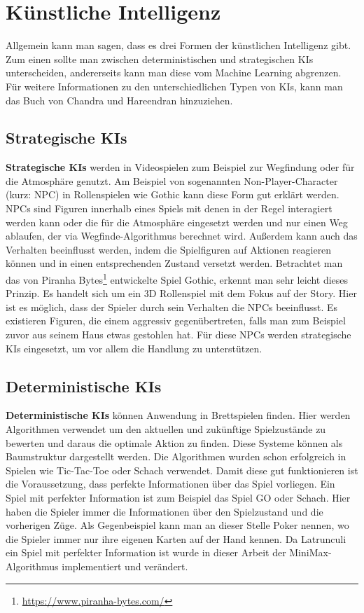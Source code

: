 \section{Künstliche Intelligenz}
\label{ch:Grundlagen:sec:Künstliche Intelligenz}
Allgemein kann man sagen, dass es drei Formen der künstlichen Intelligenz gibt. Zum einen sollte man zwischen deterministischen und strategischen KIs unterscheiden, andererseits kann man diese vom Machine Learning abgrenzen. Für weitere Informationen zu den unterschiedlichen Typen von KIs, kann man das Buch\cite{aiml} von Chandra und Hareendran hinzuziehen.

\subsection{Strategische KIs}
\label{ch:Grundlagen:sec:strategisch}
\textbf{Strategische KIs} werden in Videospielen zum Beispiel zur Wegfindung oder für die Atmosphäre genutzt. Am Beispiel von sogenannten Non-Player-Character (kurz: NPC) in Rollenspielen wie Gothic kann diese Form  gut erklärt werden. NPCs sind Figuren innerhalb eines Spiels mit denen in der Regel interagiert werden kann oder die für die Atmosphäre eingesetzt werden und nur einen Weg ablaufen, der via Wegfinde-Algorithmus berechnet wird. Außerdem kann auch das Verhalten beeinflusst werden, indem die Spielfiguren auf Aktionen reagieren können und in einen entsprechenden Zustand versetzt werden. Betrachtet man das von Piranha Bytes\footnote{\url{https://www.piranha-bytes.com/}} entwickelte Spiel Gothic, erkennt man sehr leicht dieses Prinzip. Es handelt sich um ein 3D Rollenspiel mit dem Fokus auf der Story. Hier ist es möglich, dass der Spieler durch sein Verhalten die NPCs beeinflusst. Es existieren Figuren, die einem aggressiv gegenübertreten, falls man zum Beispiel zuvor aus seinem Haus etwas gestohlen hat. Für diese NPCs werden strategische KIs eingesetzt, um vor allem die Handlung zu unterstützen.

\subsection{Deterministische KIs}
\label{ch:Grundlagen:sec:deterministisch}
\textbf{Deterministische KIs} können Anwendung in Brettspielen finden. Hier werden Algorithmen verwendet um den aktuellen und zukünftige Spielzustände zu bewerten und daraus die optimale Aktion zu finden. Diese Systeme können als Baumstruktur dargestellt werden. Die Algorithmen wurden schon erfolgreich in Spielen wie Tic-Tac-Toe oder Schach\cite{yannakakis2018artificial} verwendet. Damit diese gut funktionieren ist die Voraussetzung, dass perfekte Informationen über das Spiel vorliegen. Ein Spiel mit perfekter Information ist zum Beispiel das Spiel GO oder Schach. Hier haben die Spieler immer die Informationen über den Spielzustand und die vorherigen Züge. Als Gegenbeispiel kann man an dieser Stelle Poker nennen, wo die Spieler immer nur ihre eigenen Karten auf der Hand kennen. Da Latrunculi ein Spiel mit perfekter Information ist wurde in dieser Arbeit der MiniMax-Algorithmus implementiert und verändert.


